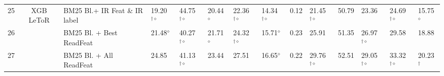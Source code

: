 \begin{table*}[t]
{\begin{tabular}{ccllllllllllll}
\midrule 
25 & \multirow{3}{*}{XGB LeToR} & BM25 Bl.+ IR Feat \& IR label  & 19.20$^{\dagger\diamond}$ & 44.75$^{\dagger\diamond}$ & 20.44$^{\diamond}$  & 22.36$^{\dagger\diamond}$ & 14.34$^{\dagger\diamond}$ & 0.12 & 21.45$^{\dagger\diamond}$ & 50.79  & 23.36 & 24.69$^{\dagger\diamond}$ & 15.75$^{\diamond}$\tabularnewline
26  &  & BM25 Bl. + Best ReadFeat  & 21.48$^{\diamond}$  & 40.27$^{\dagger\diamond}$ & 21.71$^{\diamond}$  & 24.32$^{\dagger\diamond}$ & 15.71$^{\diamond}$  & 0.23 & 25.91  & 51.35  & 26.97$^{\dagger\diamond}$ & 29.58  & 18.88 \tabularnewline
27  &  & BM25 Bl. + All ReadFeat  & 24.85  & 41.13$^{\dagger\diamond}$ & 23.44  & 27.51  & 16.65$^{\diamond}$  & 0.22 & 29.76$^{\dagger\diamond}$ & 52.51  & 29.05$^{\dagger\diamond}$ & 33.32$^{\dagger\diamond}$ & 20.23$^{\dagger}$ \tabularnewline
\bottomrule
\end{tabular}} %
\end{table*}
